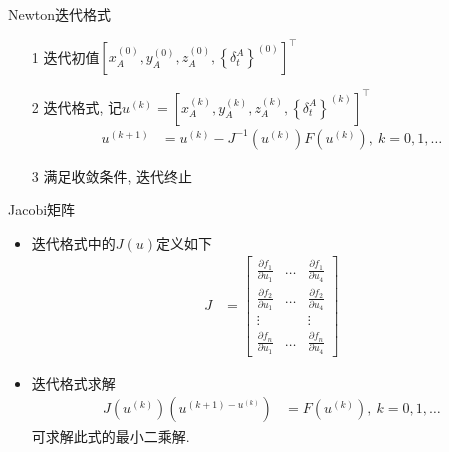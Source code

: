 \begin{frame}{Newton迭代格式}
    \begin{itemize}
        \item[1] 迭代初值$\left[ x _ A ^ { (0) }, y _ A ^ { (0) }, z _ A ^ { (0) },
        \left\{ \delta _ t ^ A \right\} ^ { (0) }  \right] ^ \top$
        \item[2] 迭代格式, 记$u ^ { (k) } = \left[ x _ A ^ { (k) }, y _ A ^ { (k) },
        z _ A ^ { (k) }, \left\{ \delta _ t ^ A \right\} ^ { (k) } \right] ^ \top$
        \begin{align*}
            u ^ { ( k + 1 ) } &= u ^ { ( k ) } - J ^ { -1 } \left( u ^ { ( k ) } \right)
            F \left( u ^ { ( k ) } \right),
            \ k = 0, 1, \ldots
        \end{align*}
        \item[3] 满足收敛条件, 迭代终止
    \end{itemize}
\end{frame}

\begin{frame}{Jacobi矩阵}
    \begin{itemize}
        \item 迭代格式中的$J \left( u \right)$定义如下
        \begin{align*}
            J &=
            \begin{bmatrix}
                    \frac{ \partial f _ 1 }{ \partial u _ 1 } & \ldots & 
                    \frac{ \partial f _ 1 }{ \partial u _ 4 } \\
                    \frac{ \partial f _ 2 }{ \partial u _ 1 } & \ldots & 
                    \frac{ \partial f _ 2 }{ \partial u _ 4 } \\
                    \vdots & & \vdots \\
                    \frac{ \partial f _ n }{ \partial u _ 1 } & \ldots &
                    \frac{ \partial f _ n }{ \partial u _ 4 }
            \end{bmatrix}
        \end{align*}
        \item 迭代格式求解
        \begin{align*}
            J \left( u ^ { ( k ) } \right) \left( u ^ { ( k + 1 ) - u ^ { ( k ) } } \right) 
            &= F \left( u ^ { ( k ) } \right), \ k = 0, 1, \ldots
        \end{align*}
        可求解此式的最小二乘解.
    \end{itemize}
\end{frame}
